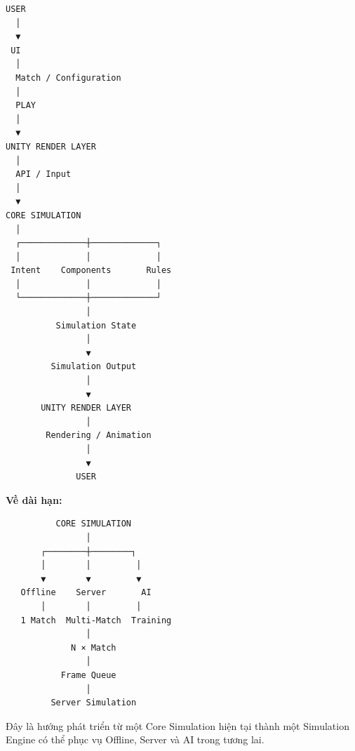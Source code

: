 \documentclass[12pt,a4paper]{article}
\begin{document}
\begin{verbatim}
USER
  │
  ▼
 UI
  │
  Match / Configuration
  │
  PLAY
  │
  ▼
UNITY RENDER LAYER
  │
  API / Input
  │
  ▼
CORE SIMULATION
  │
  ┌─────────────┼─────────────┐
  │             │             │
 Intent    Components       Rules
  │             │             │
  └─────────────┼─────────────┘
                │
          Simulation State
                │
                ▼
         Simulation Output
                │
                ▼
       UNITY RENDER LAYER
                │
        Rendering / Animation
                │
                ▼
              USER
\end{verbatim}

\textbf{Về dài hạn:}

\begin{verbatim}
          CORE SIMULATION
                │
       ┌────────┼────────┐
       │        │         │
       ▼        ▼         ▼
   Offline    Server       AI
       │        │         │
   1 Match  Multi-Match  Training
                │
             N × Match
                │
           Frame Queue
                │
         Server Simulation
\end{verbatim}

Đây là hướng phát triển từ một Core Simulation hiện tại thành một Simulation Engine có thể phục vụ Offline, Server và AI trong tương lai.
\end{document}
